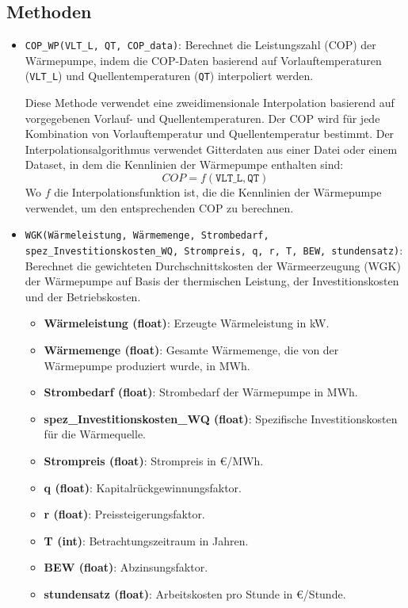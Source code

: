 \subsection{Methoden}
\begin{itemize}
    \item \texttt{COP\_WP(VLT\_L, QT, COP\_data)}: Berechnet die Leistungszahl (COP) der Wärmepumpe, indem die COP-Daten basierend auf Vorlauftemperaturen (\texttt{VLT\_L}) und Quellentemperaturen (\texttt{QT}) interpoliert werden.
    
    Diese Methode verwendet eine zweidimensionale Interpolation basierend auf vorgegebenen Vorlauf- und Quellentemperaturen. Der COP wird für jede Kombination von Vorlauftemperatur und Quellentemperatur bestimmt. Der Interpolationsalgorithmus verwendet Gitterdaten aus einer Datei oder einem Dataset, in dem die Kennlinien der Wärmepumpe enthalten sind:
    \[
    COP = f(\texttt{VLT\_L}, \texttt{QT})
    \]
    Wo \( f \) die Interpolationsfunktion ist, die die Kennlinien der Wärmepumpe verwendet, um den entsprechenden COP zu berechnen.
    
    \item \texttt{WGK(Wärmeleistung, Wärmemenge, Strombedarf, spez\_Investitionskosten\_WQ, Strompreis, q, r, T, BEW, stundensatz)}: Berechnet die gewichteten Durchschnittskosten der Wärmeerzeugung (WGK) der Wärmepumpe auf Basis der thermischen Leistung, der Investitionskosten und der Betriebskosten.
    
    \begin{itemize}
        \item \textbf{Wärmeleistung (float)}: Erzeugte Wärmeleistung in kW.
        \item \textbf{Wärmemenge (float)}: Gesamte Wärmemenge, die von der Wärmepumpe produziert wurde, in MWh.
        \item \textbf{Strombedarf (float)}: Strombedarf der Wärmepumpe in MWh.
        \item \textbf{spez\_Investitionskosten\_WQ (float)}: Spezifische Investitionskosten für die Wärmequelle.
        \item \textbf{Strompreis (float)}: Strompreis in €/MWh.
        \item \textbf{q (float)}: Kapitalrückgewinnungsfaktor.
        \item \textbf{r (float)}: Preissteigerungsfaktor.
        \item \textbf{T (int)}: Betrachtungszeitraum in Jahren.
        \item \textbf{BEW (float)}: Abzinsungsfaktor.
        \item \textbf{stundensatz (float)}: Arbeitskosten pro Stunde in €/Stunde.
    \end{itemize}
    

\end{itemize}
